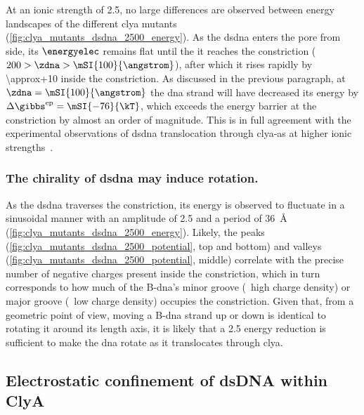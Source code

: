 At an ionic strength of \SI{2.5}{\Molar}, no large differences are observed between energy landscapes of the
different \gls{clya} mutants (\cref{fig:clya_mutants_dsdna_2500_energy}). As the \gls{dsdna} enters the pore
from \cisi{} side, its $\energyelec$ remains flat until the it reaches the constriction ($200 > \zdna >
\mSI{100}{\angstrom}$), after which it rises rapidly by \SI{\approx+10}{\kT} inside the constriction. As
discussed in the previous paragraph, at $\zdna = \mSI{100}{\angstrom}$ the \gls{dna} strand will have
decreased its energy by $\Delta \gibbs^{\textrm{ep}} = \mSI{-76}{\kT}$, which exceeds the energy barrier at
the constriction by almost an order of magnitude. This is in full agreement with the experimental observations
of \gls{dsdna} translocation through \gls{clya-as} at higher ionic
strengths~\cite{Franceschini-2013,Franceschini-2016}.

\subsubsection{The chirality of \gls{dsdna} may induce rotation.}
%

As the \gls{dsdna} traverses the constriction, its energy is observed to fluctuate in a sinusoidal manner with
an amplitude of \SI{2.5}{\kT} and a period of \SI{36}{\angstrom} (\cref{fig:clya_mutants_dsdna_2500_energy}).
Likely, the peaks (\cref{fig:clya_mutants_dsdna_2500_potential}, top and bottom) and valleys
(\cref{fig:clya_mutants_dsdna_2500_potential}, middle) correlate with the precise number of negative charges
present inside the constriction, which in turn corresponds to how much of the B-\gls{dna}'s minor groove
(\ie~high charge density) or major groove (\ie~low charge density) occupies the constriction. Given that, from
a geometric point of view, moving a B-\gls{dna} strand up or down is identical to rotating it around its
length axis, it is likely that a \SI{2.5}{\kT} energy reduction is sufficient to make the \gls{dna} rotate as it
translocates through \gls{clya}.


\subsection{Electrostatic confinement of {dsDNA} within {ClyA}}
%


